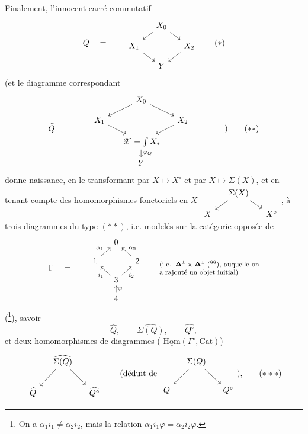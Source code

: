 \documentclass[11pt]{article}
\newcommand{\printedpage}[1]{\marginpar{\footnotesize p.~#1}}
\newcommand{\msp}[1]{\marginpar{\footnotesize [#1]}}
\newcommand{\Cat}{\mathrm{Cat}}
\newcommand{\sX}{\mathscr{X}}
\newcommand{\Hom}{\mathrm{Hom}}
\begin{document}
Finalement, l'innocent carré commutatif
\[
Q \quad = \qquad
\begin{tikzcd}[row sep=small, column sep=small]
 & X_0 \arrow[dl] \arrow[dr] & \\
X_1 \arrow[dr] & & X_2 \arrow[dl] \\
 & Y &
\end{tikzcd}
\tag*{$(*)$}
\]
(et le diagramme correspondant
\[
\widehat{Q} \quad = \qquad
\begin{tikzcd}[row sep=small, column sep=small]
 & X_0 \arrow[dl] \arrow[dr] & \\
X_1 \arrow[dr] & & X_2 \arrow[dl] \\
 & \sX=\int X_* \arrow[d, "\varphi_Q"] & \\
 & Y &
\end{tikzcd}
\qquad\qquad )
\tag*{$(**)$}
\]
donne naissance, en le transformant
\msp{page 139}
par $X\longmapsto X^\circ$ et par $X\longmapsto\Sigma(X)$, et en tenant compte des homomorphismes fonctoriels en $X$ $\begin{tikzcd}[row sep=small, column sep=small]
 & \Sigma(X) \arrow[dl] \arrow[dr] & \\
X & & X^\circ
\end{tikzcd}$, à trois diagrammes du type $(**)$, i.e. modelés sur la catégorie opposée de
\[
\Gamma \quad = \qquad
\begin{tikzcd}[row sep=small, column sep=small]
 & 0 & \\
1 \arrow[ur, "\alpha_1"] & & 2 \arrow[ul, "\alpha_2"'] \\
 & 3 \arrow[ul, "i_1"] \arrow[ur, "i_2"'] & \\
 & 4 \arrow[u, "\varphi"'] &
\end{tikzcd}
\qquad
\text{\parbox[c]{0.35\textwidth}{\footnotesize (i.e. $\boldsymbol{\Delta}^1\times\boldsymbol{\Delta}^1$ (\footnotemark[88]), auquelle on a rajouté un objet initial)}} %
\]
\printedpage{95}
(\footnote[89]{On a $\alpha_1i_1\neq\alpha_2i_2$, mais la relation $\alpha_1i_1\varphi=\alpha_2i_2\varphi$.}), savoir
\[
\widehat{Q}, \qquad \widehat{\Sigma(Q)}, \qquad \widehat{Q^\circ},
\]
et deux homomorphismes de diagrammes ( $\underline{\Hom}(\Gamma^\circ,\Cat)$)
\[
\begin{tikzcd}[column sep=small]
 & \widehat{\Sigma(Q)} \arrow[dl] \arrow[dr] & \\
\widehat{Q} & & \widehat{Q^\circ}
\end{tikzcd}
\qquad
\text{(déduit de }
\begin{tikzcd}[column sep=small]
 & \Sigma(Q) \arrow[dl] \arrow[dr] & \\
Q & & Q^\circ
\end{tikzcd}
\text{),}
\tag*{$(***)$}
\]
\end{document}
